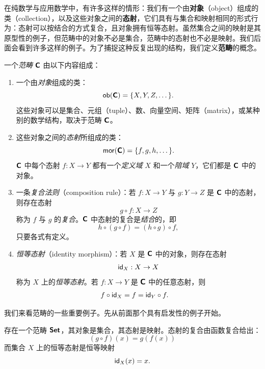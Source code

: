 在纯数学与应用数学中，有许多这样的情形：我们有一个由{\bf 对象}（object）组成的类（collection），以及这些对象之间的{\bf 态射}，它们具有与集合和映射相同的形式行为：态射可以按结合的方式复合，且对象拥有恒等态射。虽然集合之间的映射是其原型性的例子，但范畴中的对象不必是集合，范畴中的态射也不必是映射。我们后面会看到许多这样的例子。为了捕捉这种反复出现的结构，我们定义{\bf 范畴}的概念。



\begin{definition}
一个{\it 范畴} ${\boldsymbol{\mathsf{C}}}$ 由以下内容组成：
\begin{enumerate}[left = 0pt]
    \item 一个由{\it 对象}组成的类：
    \[\mathsf{ob}({\boldsymbol{\mathsf{C}}})=\{X,Y,Z,\dots \}.\]
    这些对象可以是集合、元组（tuple）、数、向量空间、矩阵（matrix），或某种别的数学结构，取决于范畴 ${\boldsymbol{\mathsf{C}}}$。
    \item 这些对象之间的{\it 态射}所组成的类：
    \[
    \mathsf{mor}({\boldsymbol{\mathsf{C}}}) = \{f,g,h,\dots\}.
    \]
    ${\boldsymbol{\mathsf{C}}}$ 中每个态射 $f:X \to Y$ 都有一个{\it 定义域} $X$
    和一个{\it 陪域} $Y$，它们都是 ${\boldsymbol{\mathsf{C}}}$ 中的对象。
    \item 一条{\it 复合法则}（composition rule）：若 $f:X \to Y$ 与 $g:Y \to Z$ 是 ${\boldsymbol{\mathsf{C}}}$ 中的态射，则存在态射
    \[g \circ f:X \to Z\]
    称为 $f$ 与 $g$ 的{\it 复合}。${\boldsymbol{\mathsf{C}}}$ 中态射的复合是{\it 结合}的，即
    \[h \circ (g \circ f) = (h \circ g) \circ f,\]
    只要各式有定义。
    \item {\it 恒等态射}（identity morphism）：若 $X$ 是 ${\boldsymbol{\mathsf{C}}}$ 中的对象，则存在态射 \[\mathsf{id}_X:X \to X\]
    称为 $X$ 上的{\it 恒等态射}。若 $f:X \to Y$ 是 ${\boldsymbol{\mathsf{C}}}$ 中的任意态射，则
    \begin{align*}
    f \circ \mathsf{id}_X & = f = \mathsf{id}_Y \circ f.
    \end{align*}
    \end{enumerate}
\end{definition}

我们来看范畴的一些重要例子。先从前面那个具有启发性的例子开始。
\begin{example}
        存在一个范畴 ${\boldsymbol{\mathsf{Set}}}$，其对象是集合，其态射是映射。态射的复合由函数复合给出：
        \[
        (g \circ f)(x) = g(f(x))
        \]
        而集合 $X$ 上的恒等态射是恒等映射
        \[
        \mathsf{id}_X(x) = x.
        \]
\end{example}



